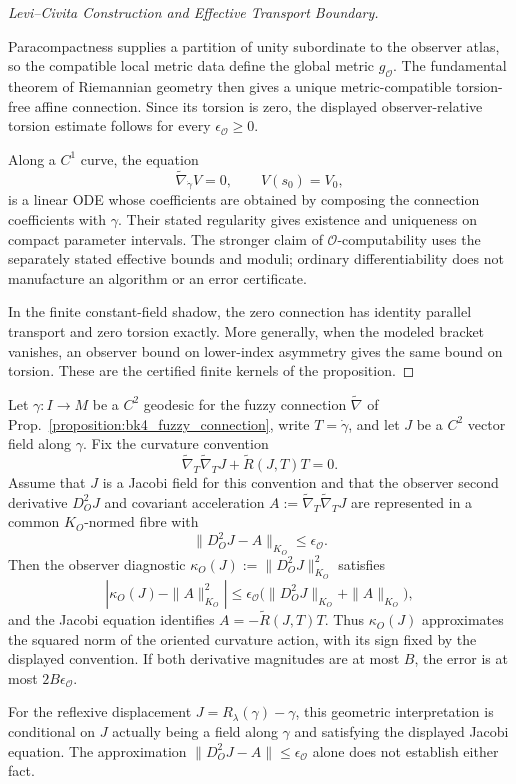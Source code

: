 \begin{proof}[Levi--Civita Construction and Effective Transport Boundary]
\label{proof:bk4_sketch_chart_connections}
\leavevmode

Paracompactness supplies a partition of unity subordinate to the observer
atlas, so the compatible local metric data define the global metric
$g_{\mathcal O}$.  The fundamental theorem of Riemannian geometry then gives a
unique metric-compatible torsion-free affine connection.  Since its torsion is
zero, the displayed observer-relative torsion estimate follows for every
$\epsilon_{\mathcal O}\geq0$.

Along a $C^1$ curve, the equation
\begin{equation}
\tilde\nabla_{\dot\gamma}V=0,\qquad V(s_0)=V_0,
\end{equation}
is a linear ODE whose coefficients are obtained by composing the connection
coefficients with $\gamma$.  Their stated regularity gives existence and
uniqueness on compact parameter intervals.  The stronger claim of
$\mathcal O$-computability uses the separately stated effective bounds and
moduli; ordinary differentiability does not manufacture an algorithm or an
error certificate.

In the finite constant-field shadow, the zero connection has identity parallel
transport and zero torsion exactly.  More generally, when the modeled bracket
vanishes, an observer bound on lower-index asymmetry gives the same bound on
torsion.  These are the certified finite kernels of the proposition.
\end{proof}
\begin{proposition}
\label{proposition:bk4_geodesic_failure}
Let $\gamma:I\to M$ be a $C^2$ geodesic for the fuzzy connection
$\tilde\nabla$ of Prop.~\ref{proposition:bk4_fuzzy_connection}, write
$T=\dot\gamma$, and let $J$ be a $C^2$ vector field along $\gamma$.  Fix the
curvature convention
\[
  \tilde\nabla_T\tilde\nabla_TJ+\tilde R(J,T)T=0.
\]
Assume that $J$ is a Jacobi field for this convention and that the observer
second derivative $D_O^2J$ and covariant acceleration
$A:=\tilde\nabla_T\tilde\nabla_TJ$ are represented in a common
$K_O$-normed fibre with
\[
  \|D_O^2J-A\|_{K_O}\leq\epsilon_{\mathcal O}.
\]
Then the observer diagnostic $\kappa_O(J):=\|D_O^2J\|_{K_O}^2$ satisfies
\[
 \left|\kappa_O(J)-\|A\|_{K_O}^2\right|
 \leq
 \epsilon_{\mathcal O}
 \bigl(\|D_O^2J\|_{K_O}+\|A\|_{K_O}\bigr),
\]
and the Jacobi equation identifies
$A=-\tilde R(J,T)T$.  Thus $\kappa_O(J)$ approximates the squared norm of the
oriented curvature action, with its sign fixed by the displayed convention.
If both derivative magnitudes are at most $B$, the error is at most
$2B\epsilon_{\mathcal O}$.

For the reflexive displacement $J=R_\lambda(\gamma)-\gamma$, this geometric
interpretation is conditional on $J$ actually being a field along $\gamma$
and satisfying the displayed Jacobi equation.  The approximation
$\|D_O^2J-A\|\leq\epsilon_{\mathcal O}$ alone does not establish either fact.
\end{proposition}

